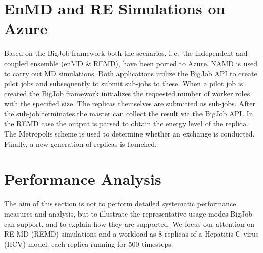 \documentclass[conference,final]{IEEEtran}
\newcommand{\up}{\vspace*{-1em}}
\newcommand{\numrep}{8 }
\newcommand{\alnote}[1]{ {\textcolor{blue} { ***AL: #1 }}}
\newcommand{\jhanote}[1]{ {\textcolor{red} { ***SJ: #1 }}}
\newcommand{\alnote}[1]{}
\newcommand{\jhanote}[1]{}
\begin{document}
\up
\section{EnMD and RE Simulations on Azure}
\label{sec:enMD-REMD}
\up
Based on the BigJob framework both the scenarios, i.\,e.\ the
independent and coupled ensemble (enMD \& REMD),
have been ported to Azure. NAMD is used to carry out MD simulations.
Both applications utilize the BigJob API to create pilot jobs
and subsequently to submit sub-jobs to these. When a pilot job is
created the BigJob framework initializes the requested number
of worker roles with the specified size. The replicas themselves are submitted as
sub-jobs. 
After the sub-job terminates,the master can collect the result via the BigJob API. 
In the REMD case the output is parsed to obtain the energy level of the replica. 
The Metropolis scheme is used to determine whether
an exchange is conducted. Finally, a new generation of replicas is launched.



\up
\section{Performance Analysis}
\label{sec:performance}
\up The aim of this section is not to perform detailed systematic
performance measures and analysis, but to illustrate the
representative usage modes BigJob can support, and to explain how they
are supported.  %
We focus our attention on RE MD (REMD) simulations
and a workload as \numrep replicas of a Hepatitis-C virus (HCV) model,
each replica running for 500 timesteps.  \up
\end{document}
